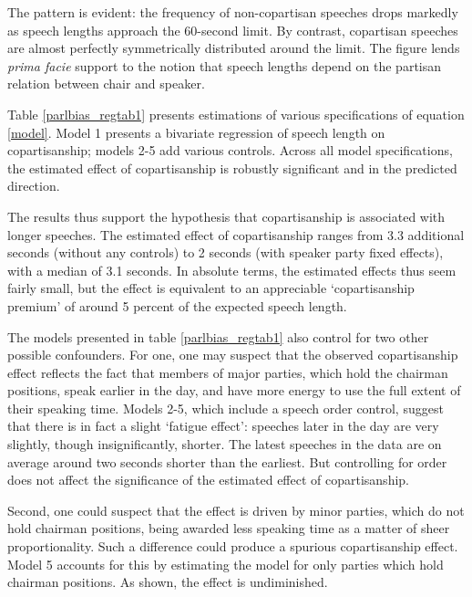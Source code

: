 \documentclass[12pt,a4paper]{article}
\begin{document}

The pattern is evident: the frequency of non-copartisan speeches drops markedly as speech lengths approach the 60-second limit. By contrast, copartisan speeches are almost perfectly symmetrically distributed around the limit. The figure lends \textit{prima facie} support to the notion that speech lengths depend on the partisan relation between chair and speaker.

Table \ref{parlbias_regtab1} presents estimations of various specifications of equation \ref{model}. Model 1 presents a bivariate regression of speech length on copartisanship; models 2-5 add various controls. Across all model specifications, the estimated effect of copartisanship is robustly significant and in the predicted direction. 



The results thus support the hypothesis that copartisanship is associated with longer speeches. The estimated effect of copartisanship ranges from 3.3 additional seconds (without any controls) to 2 seconds (with speaker party fixed effects), with a median of 3.1 seconds. In absolute terms, the estimated effects thus seem fairly small, but the effect is equivalent to an appreciable `copartisanship premium' of around 5 percent of the expected speech length.

The models presented in table \ref{parlbias_regtab1} also control for two other possible confounders. For one, one may suspect that the observed copartisanship effect reflects the fact that members of major parties, which hold the chairman positions, speak earlier in the day, and have more energy to use the full extent of their speaking time. Models 2-5, which include a speech order control, suggest that there is in fact a slight `fatigue effect': speeches later in the day are very slightly, though insignificantly, shorter. The latest speeches in the data are on average around two seconds shorter than the earliest. But controlling for order does not affect the significance of the estimated effect of copartisanship.

Second, one could suspect that the effect is driven by minor parties, which do not hold chairman positions, being awarded less speaking time as a matter of sheer proportionality. Such a difference could produce a spurious copartisanship effect. Model 5 accounts for this by estimating the model for only parties which hold chairman positions. As shown, the effect is undiminished.
\end{document}
